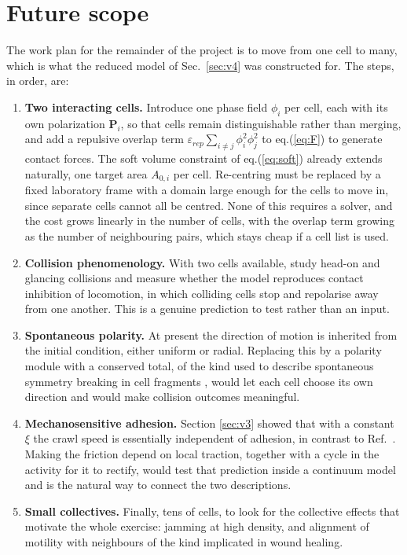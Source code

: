 \documentclass[11pt]{article}
\begin{document}

\section{Future scope}
\label{sec:scope}
The work plan for the remainder of the project is to move from one cell to many,
which is what the reduced model of Sec.~\ref{sec:v4} was constructed for. The
steps, in order, are:

\begin{enumerate}
\item \textbf{Two interacting cells.} Introduce one phase field $\phi_i$ per cell,
each with its own polarization $\mathbf{P}_i$, so that cells remain
distinguishable rather than merging, and add a repulsive overlap term
$\varepsilon_{rep}\sum_{i\neq j}\phi_i^{2}\phi_j^{2}$ to eq.(\ref{eq:F}) to
generate contact forces. The soft volume constraint of eq.(\ref{eq:soft}) already
extends naturally, one target area $A_{0,i}$ per cell. Re-centring must be
replaced by a fixed laboratory frame with a domain large enough for the cells to
move in, since separate cells cannot all be centred. None of this requires a
solver, and the cost grows linearly in the number of cells, with the overlap term
growing as the number of neighbouring pairs, which stays cheap if a cell list is
used.

\item \textbf{Collision phenomenology.} With two cells available, study head-on
and glancing collisions and measure whether the model reproduces contact
inhibition of locomotion, in which colliding cells stop and repolarise away from
one another. This is a genuine prediction to test rather than an input.

\item \textbf{Spontaneous polarity.} At present the direction of motion is
inherited from the initial condition, either uniform or radial. Replacing this by
a polarity module with a conserved total, of the kind used to describe
spontaneous symmetry breaking in cell fragments \cite{Verkhovsky:1999,Yam:2007},
would let each cell choose its own direction and would make collision outcomes
meaningful.

\item \textbf{Mechanosensitive adhesion.} Section \ref{sec:v3} showed that with a
constant $\xi$ the crawl speed is essentially independent of adhesion, in contrast
to Ref.~\cite{Leoni:2017}. Making the friction depend on local traction, together
with a cycle in the activity for it to rectify, would test that prediction inside
a continuum model and is the natural way to connect the two descriptions.

\item \textbf{Small collectives.} Finally, tens of cells, to look for the
collective effects that motivate the whole exercise: jamming at high density, and
alignment of motility with neighbours of the kind implicated in wound healing.
\end{enumerate}
\end{document}
